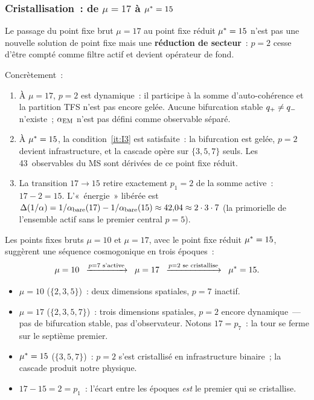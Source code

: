 \documentclass[12pt,a4paper]{article}
\begin{document}
\subsubsection{Cristallisation~: de $\mu = 17$ à ${\mu^{*}} = 15$}
\label{sec:ch8_crystallisation}

\begin{proposition}
\label{prop:crystallisation}
Le passage du point fixe brut $\mu = 17$ au point fixe réduit
${\mu^{*}} = 15$ n'est pas une nouvelle solution de point fixe mais
une \textbf{réduction de secteur}~: $p = 2$ cesse d'être compté
comme filtre actif et devient opérateur de fond.

Concrètement~:
\begin{enumerate}[nosep]
\item À $\mu = 17$, $p = 2$ est dynamique~: il participe à la somme
  d'auto-cohérence et la partition TFS n'est pas encore gelée.
  Aucune bifurcation stable $q_{+} \neq q_{-}$ n'existe~;
  $\alpha_{\mathrm{EM}}$ n'est pas défini comme observable séparé.
\item À ${\mu^{*}} = 15$, la condition~\ref{it:I3} est satisfaite~:
  la bifurcation est gelée, $p = 2$ devient infrastructure, et
  la cascade opère sur $\{3,5,7\}$ seuls. Les 43~observables du MS
  sont dérivées de ce point fixe réduit.
\item La transition $17 \to 15$ retire exactement $p_1 = 2$ de la
  somme active~: $17 - 2 = 15$. L'«~énergie~» libérée est
  $\Delta(1/\alpha) = 1/\alpha_{\rm bare}(17) - 1/\alpha_{\rm bare}(15)
  \approx 42{,}04 \approx 2 \cdot 3 \cdot 7$ (la primorielle de
  l'ensemble actif sans le premier central $p = 5$).
\end{enumerate}
\end{proposition}

\begin{remarque}
\label{rem:cosmogonic}
Les points fixes bruts $\mu = 10$ et $\mu = 17$, avec le point fixe
réduit ${\mu^{*}} = 15$, suggèrent une séquence cosmogonique en trois
époques~:
\[
  \mu = 10 \;\;\xrightarrow{p = 7 \text{ s'active}}\;\;
  \mu = 17 \;\;\xrightarrow{p = 2 \text{ se cristallise}}\;\;
  {\mu^{*}} = 15.
\]
\begin{itemize}[nosep]
\item $\mu = 10$ ($\{2,3,5\}$)~: deux dimensions spatiales,
  $p = 7$ inactif.
\item $\mu = 17$ ($\{2,3,5,7\}$)~: trois dimensions spatiales,
  $p = 2$ encore dynamique~--- pas de bifurcation stable,
  pas d'observateur. Notons $17 = p_7$~: la tour se ferme sur le
  septième premier.
\item ${\mu^{*}} = 15$ ($\{3,5,7\}$)~: $p = 2$ s'est cristallisé en
  infrastructure binaire~; la cascade produit notre physique.
\item $17 - 15 = 2 = p_1$~: l'écart entre les époques \emph{est}
  le premier qui se cristallise.
\end{itemize}
\end{remarque}
\end{document}
